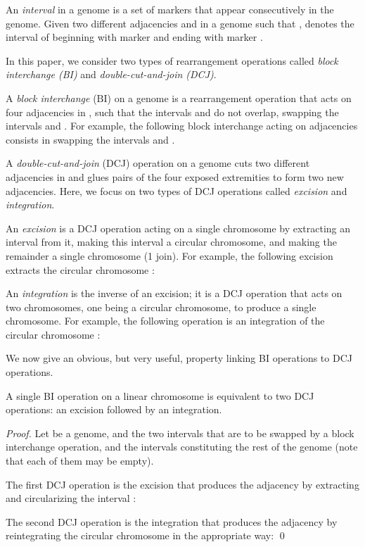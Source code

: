 \documentclass{llncs}
\def\bi{\ensuremath{\mbox{BI}}}
\begin{document}
An \emph{interval} in a genome is a set of markers that appear consecutively 
in the genome. Given two different adjacencies  and  in a genome 
 such that ,  denotes the interval of  beginning 
with marker  and ending with marker .

In this paper, we consider two types of rearrangement operations called \emph{block interchange (BI)} and  \emph{double-cut-and-join (DCJ)}.

A \emph{block interchange} (\bi) on a genome  is a rearrangement 
operation that acts on four adjacencies in , 
 such that the intervals  and 
 do not overlap, swapping the intervals  and .
For example, the following block interchange acting on adjacencies 
consists in swapping the intervals  and . 
\begin{center}





\end{center}

A \emph{double-cut-and-join} (DCJ) operation on a genome  cuts two different 
adjacencies in  and glues pairs of the four exposed extremities to form two 
new adjacencies. 
Here, we focus on two types of DCJ operations called \emph{excision} and \emph{integration}.

An \emph{excision} is a DCJ operation acting on a single chromosome by extracting an interval from it, making this interval a circular chromosome, and making the remainder a single chromosome (1 join). For example, the following excision extracts the circular chromosome :
 

An \emph{integration} is the inverse of an excision; it is a DCJ operation that acts on two chromosomes, one being a circular chromosome, to produce a single chromosome.  For example, the following operation is an integration of the circular chromosome :


We now give an obvious, but very useful, property linking BI operations to DCJ operations.

\begin{property}
\label{1BIto2DCJ}
A single BI operation on a linear chromosome is equivalent to two DCJ operations: an excision followed by an integration.
\end{property}


\begin{proof}
Let  be a genome,  and  the two intervals 
that are to be swapped by a block interchange operation,   and  the 
intervals constituting the rest of the genome (note that each of them may be 
empty). 

The first DCJ operation is the excision that produces the adjacency
 by extracting and circularizing the interval : 


The second DCJ operation is the integration that produces the adjacency
 by reintegrating the circular chromosome  in the
appropriate way:
\qed
\end{proof}
\end{document}
